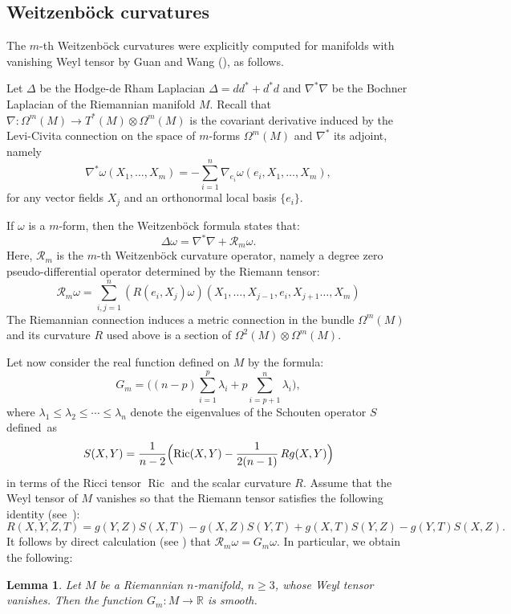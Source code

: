 \documentclass[JEP,XML,SOM,Unicode]{cedram}
\let\mathcal\mathscr
\DeclareMathOperator{\Ric}{Ric}
\newtheorem{lemma}[theorem]{Lemma}
\theoremstyle{definition}
\theoremstyle{remark}
\numberwithin{equation}{section}
\newcommand{\RR}{\mathbb R}
\begin{document}
\subsection{Weitzenböck curvatures}
The $m$-th Weitzenböck curvatures were explicitly computed
for manifolds with vanishing Weyl tensor by Guan and Wang (\cite{GW}), as follows.

Let $\Delta$ be the Hodge-de Rham Laplacian
$\Delta=dd^*+d^*d$ and $\nabla^*\nabla$ be the Bochner Laplacian of the Riemannian manifold $M$.
Recall that $\nabla:\Omega^m(M)\to T^*(M)\otimes \Omega^m(M)$ is the covariant derivative
induced by the Levi-Civita connection on the space of $m$\nobreakdash-forms $\Omega^m(M)$ and $\nabla^*$ its adjoint, namely
\[ \nabla^*\omega(X_1,\ldots,X_m)=-\sum_{i=1}^n\nabla_{e_i}\omega(e_i,X_1,\ldots,X_m) ,\]
for any vector fields $X_j$ and an orthonormal local basis $\{e_i\}$.

If $\omega$ is a $m$-form, then the Weitzenböck formula states that:
\[ \Delta \omega = \nabla^*\nabla + \mathcal R_m \omega.\]
Here, $\mathcal R_m$ is the $m$-th Weitzenböck curvature operator, namely a degree zero pseudo-differential operator
determined by the Riemann tensor:
\[ \mathcal R_m\omega= \sum_{i,j=1}^n (R(e_i,X_j)\omega)(X_1,\ldots, X_{j-1},e_i,X_{j+1}\ldots,X_m)\]
The Riemannian connection induces a metric connection in the bundle $\Omega^m(M)$ and its curvature
$R$ used above is a section of $\Omega^2(M)\otimes \Omega^m(M)$.

Let now consider the real function defined on $M$ by the formula:
\[ G_m=\biggl((n-p)\sum_{i=1}^p\lambda_i +p\sum_{i=p+1}^n\lambda_i\biggr),\]
where $\lambda_1\!\leq\!\lambda_2\!\leq \cdots \leq\!\lambda_n$ denote
the eigenvalues of the Schouten operator $S$ defined~as
\[ S(X,Y)= \frac{1}{n-2}\Bigl(\Ric(X,Y)-\frac{1}{2(n-1)}\,R g(X,Y)\Bigr)\]
in terms of the Ricci tensor $\Ric$ and the scalar curvature $R$.
Assume that the Weyl tensor of $M$ vanishes so that
the Riemann tensor satisfies the following identity (see~\cite{La}):
\[ R(X,Y,Z,T)=g(Y,Z)S(X,T)-g(X,Z)S(Y,T)+g(X,T)S(Y,Z)-g(Y,T)S(X,Z).\]
It follows by direct calculation (see \cite[App.]{GW}) that $\mathcal R_m \omega = G_m \omega$.
In particular, we obtain the following:
\begin{lemma}\label{weitz}
Let $M$ be a Riemannian $n$-manifold, $n\geq3$, whose Weyl tensor vanishes.
Then the function $G_m:M\to \RR$ is smooth.
\end{lemma}
\end{document}
